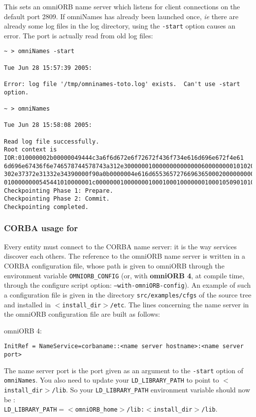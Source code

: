 This sets an omniORB name server which listens for client connections on the
default port 2809. If omniNames has already been launched once, \emph{ie} there
are already some log files in the log directory, using the \texttt{-start}
option causes an error. The port is actually read from old log files:

{\footnotesize
\begin{verbatim}
~ > omniNames -start

Tue Jun 28 15:57:39 2005:

Error: log file '/tmp/omninames-toto.log' exists.  Can't use -start option.

~ > omniNames  

Tue Jun 28 15:58:08 2005:

Read log file successfully.
Root context is IOR:010000002b00000049444c3a6f6d672e6f72672f436f734e616d696e672f4e61
6d696e67436f6e746578744578743a312e300000010000000000000060000000010102000d0000003134
302e37372e31332e34390000f90a0b0000004e616d655365727669636500020000000000000008000000
0100000000545441010000001c0000000100000001000100010000000100010509010100010000000901
Checkpointing Phase 1: Prepare.
Checkpointing Phase 2: Commit.
Checkpointing completed.
\end{verbatim}
}

\subsubsection{CORBA usage for \diet}

Every \diet entity must connect to the CORBA name server: it is the way
services discover each others. The reference to the omniORB name server is
written in a CORBA configuration file, whose path is given to omniORB through
the environment variable \texttt{OMNIORB\_CONFIG} (or, with \textbf{omniORB 4},
at compile time, through the configure script option:
\texttt{--with-omniORB-config}). An example of such a configuration file is
given in the directory \texttt{src/examples/cfgs} of the \diet source tree and
installed in \texttt{$<$install\_dir$>$/etc}. The lines concerning the name
server in the omniORB configuration file are built as follows:
\begin{description}
 \item{omniORB 4:}
{\footnotesize
\begin{verbatim}
InitRef = NameService=corbaname::<name server hostname>:<name server port>
\end{verbatim}
} 
\end{description}
The name server port is the port given as an argument to the \texttt{-start}
option of \texttt{omniNames}. You also need to update your
\texttt{LD\_LIBRARY\_PATH} to point to \texttt{$<$install\_dir$>$/lib}.  So
your \texttt{LD\_LIBRARY\_PATH} environment variable should now be
:\\ \texttt{LD\_LIBRARY\_PATH$= <$omniORB\_home$>$/lib:$<$install\_dir$>$/lib}.


